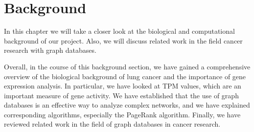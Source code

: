 \section{Background} \label{sec:background}
In this chapter we will take a closer look at the biological and computational background of our project.
Also, we will discuss related work in the field cancer research with graph databases.







Overall, in the course of this background section,
we have gained a comprehensive overview of the biological background of lung cancer and
the importance of gene expression analysis.
In particular, we have looked at TPM values, which are an important measure of gene activity.
We have established that the use of graph databases is an effective way to analyze complex networks,
and we have explained corresponding algorithms, especially the PageRank algorithm.
Finally, we have reviewed related work in the field of graph databases in cancer research.
